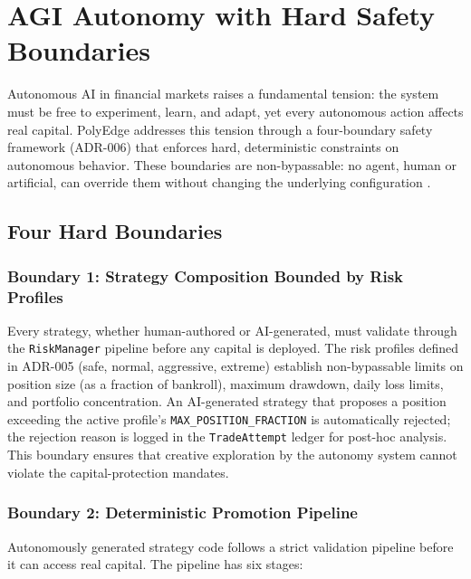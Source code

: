 \section{AGI Autonomy with Hard Safety Boundaries}\label{sec:autonomy}

Autonomous AI in financial markets raises a fundamental tension: the system must be free to experiment, learn, and adapt, yet every autonomous action affects real capital. PolyEdge addresses this tension through a four-boundary safety framework (ADR-006) that enforces hard, deterministic constraints on autonomous behavior. These boundaries are non-bypassable: no agent, human or artificial, can override them without changing the underlying configuration \citep{amodei2016concrete, russell2020human}.

\subsection{Four Hard Boundaries}

\subsubsection{Boundary 1: Strategy Composition Bounded by Risk Profiles}

Every strategy, whether human-authored or AI-generated, must validate through the \texttt{RiskManager} pipeline before any capital is deployed. The risk profiles defined in ADR-005 (safe, normal, aggressive, extreme) establish non-bypassable limits on position size (as a fraction of bankroll), maximum drawdown, daily loss limits, and portfolio concentration. An AI-generated strategy that proposes a position exceeding the active profile's \texttt{MAX\_POSITION\_FRACTION} is automatically rejected; the rejection reason is logged in the \texttt{TradeAttempt} ledger for post-hoc analysis. This boundary ensures that creative exploration by the autonomy system cannot violate the capital-protection mandates.

\subsubsection{Boundary 2: Deterministic Promotion Pipeline}

Autonomously generated strategy code follows a strict validation pipeline before it can access real capital. The pipeline has six stages:

